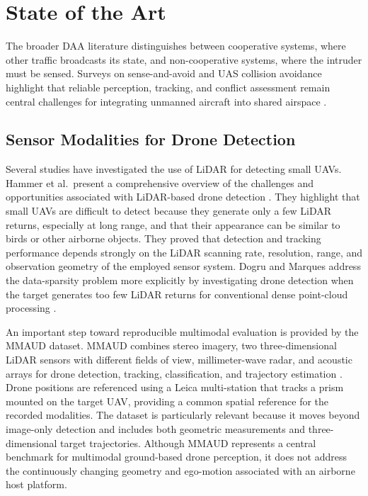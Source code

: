 \chapter{State of the Art}

The broader DAA literature distinguishes between cooperative systems, where other traffic broadcasts its state, and non-cooperative systems, where the intruder must be sensed. Surveys on sense-and-avoid and UAS collision avoidance highlight that reliable perception, tracking, and conflict assessment remain central challenges for integrating unmanned aircraft into shared airspace \cite{fasano2016senseAvoid,skowron2019senseAvoidSmallUAS,pham2015collisionAvoidanceSurvey}.

\section{Sensor Modalities for Drone Detection}

Several studies have investigated the use of LiDAR for detecting small UAVs. Hammer et al.\ present a comprehensive overview of the challenges and opportunities associated with LiDAR-based drone detection \cite{hammer2018potentialLidarUAV,hammer2018lidarSmallUAVs}. They highlight that small UAVs are difficult to detect because they generate only a few LiDAR returns, especially at long range, and that their appearance can be similar to birds or other airborne objects. They proved that detection and tracking performance depends strongly on the LiDAR scanning rate, resolution, range, and observation geometry of the employed sensor system.
Dogru and Marques address the data-sparsity problem more explicitly by investigating drone detection when the target generates too few LiDAR returns for conventional dense point-cloud processing \cite{dogru2022sparseLidarDrone}.

An important step toward reproducible multimodal evaluation is provided by the MMAUD dataset. MMAUD combines stereo imagery, two three-dimensional LiDAR sensors with different fields of view, millimeter-wave radar, and acoustic arrays for drone detection, tracking, classification, and trajectory estimation \cite{yuan2024mmaud}. Drone positions are referenced using a Leica multi-station that tracks a prism mounted on the target UAV, providing a common spatial reference for the recorded modalities. The dataset is particularly relevant because it moves beyond image-only detection and includes both geometric measurements and three-dimensional target trajectories. Although MMAUD represents a central benchmark for multimodal ground-based drone perception, it does not address the continuously changing geometry and ego-motion associated with an airborne host platform.


